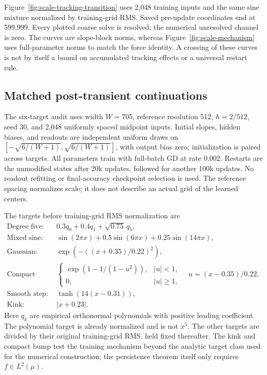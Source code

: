 Figure~\ref{fig:scale-tracking-transition} uses 2,048 training inputs and
the same sine mixture normalized by training-grid RMS. Saved pre-update
coordinates end at 599,999. Every plotted coarse solve is resolved; the
numerical unresolved channel is zero. The curves are slope-block norms,
whereas Figure~\ref{fig:scale-mechanism} uses full-parameter norms to match
the force identity. A crossing of these curves is not by itself a bound
on accumulated tracking effects or a universal restart rule.

\subsection{Matched post-transient continuations}
The six-target audit uses width $W=705$, reference resolution 512,
$h=2/512$, seed 30, and 2,048 uniformly spaced midpoint inputs. Initial
slopes, hidden biases, and readouts are independent uniform draws on
$[-\sqrt{6/(W+1)},\sqrt{6/(W+1)}]$, with output bias zero; initialization
is paired across targets. All parameters train with full-batch GD at
rate 0.002. Restarts are the unmodified states after 20k updates, followed
for another 100k updates. No readout refitting or final-accuracy checkpoint
selection is used. The reference spacing normalizes scale; it does not
describe an actual grid of the learned centers.

The targets before training-grid RMS normalization are
\begin{align*}
\text{Degree five: }&0.3q_0+0.4q_1+\sqrt{0.75}\,q_5,\\
\text{Mixed sine: }&\sin(2\pi x)+0.5\sin(6\pi x)+0.25\sin(14\pi x),\\
\text{Gaussian: }&\exp\!\left(-((x+0.35)/0.22)^2\right),\\
\text{Compact bump: }&\begin{cases}\exp(1-1/(1-u^2)),&|u|<1,\\0,&|u|\ge1,\end{cases}
\quad u=(x-0.35)/0.22,\\
\text{Smooth step: }&\tanh(14(x-0.31)),\\
\text{Kink: }&|x+0.23|.
\end{align*}
Here $q_k$ are empirical orthonormal polynomials with positive leading
coefficient. The polynomial target is already normalized and is not $x^5$.
The other targets are divided by their original training-grid RMS, held
fixed thereafter. The kink and compact bump test the training mechanism
beyond the analytic target class used for the numerical construction;
the persistence theorem itself only requires $f\in L^2(\mu)$.

